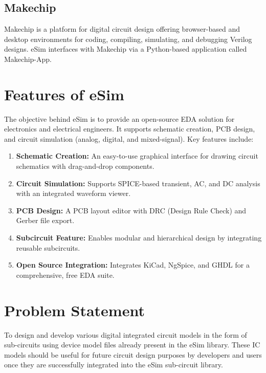 \documentclass[12pt,a4paper]{report}
\begin{document}
\section{Makechip}
Makechip is a platform for digital circuit design offering browser-based
and desktop environments for coding, compiling, simulating, and debugging
Verilog designs. eSim interfaces with Makechip via a Python-based
application called Makechip-App.

\chapter{Features of eSim}

The objective behind eSim is to provide an open-source EDA solution for
electronics and electrical engineers. It supports schematic creation, PCB
design, and circuit simulation (analog, digital, and mixed-signal). Key
features include:

\begin{enumerate}
  \item \textbf{Schematic Creation:} An easy-to-use graphical interface for
    drawing circuit schematics with drag-and-drop components.
  \item \textbf{Circuit Simulation:} Supports SPICE-based transient, AC,
    and DC analysis with an integrated waveform viewer.
  \item \textbf{PCB Design:} A PCB layout editor with DRC (Design Rule
    Check) and Gerber file export.
  \item \textbf{Subcircuit Feature:} Enables modular and hierarchical
    design by integrating reusable subcircuits.
  \item \textbf{Open Source Integration:} Integrates KiCad, NgSpice, and
    GHDL for a comprehensive, free EDA suite.
\end{enumerate}

\chapter{Problem Statement}

To design and develop various digital integrated circuit models in the
form of sub-circuits using device model files already present in the eSim
library. These IC models should be useful for future circuit design
purposes by developers and users once they are successfully integrated
into the eSim sub-circuit library.
\end{document}

